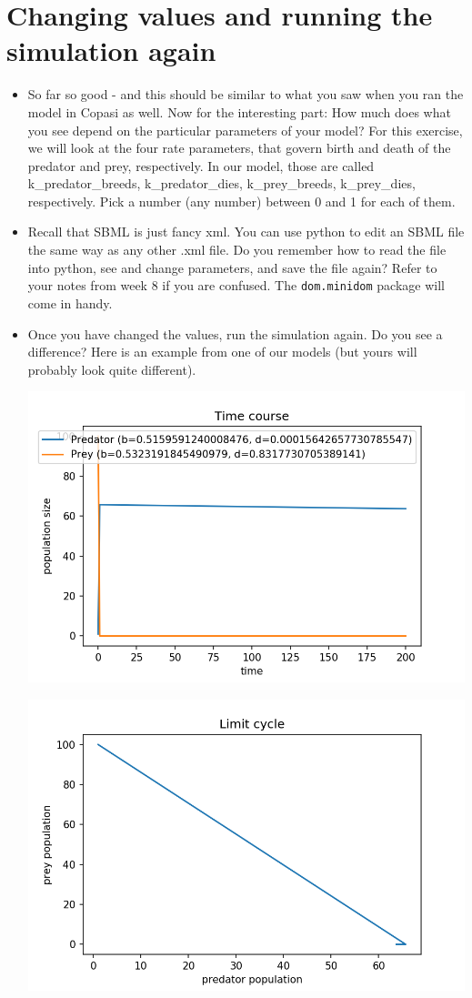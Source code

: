 \documentclass[pdflatex,a4paper]{article}
\begin{document}
\section{Changing values and running the simulation again}

\begin{itemize}
\item
So far so good - and this should be similar to what you saw when you ran the model in Copasi as well. Now for the interesting part: How much does what you see depend on the particular parameters of your model? For this exercise, we will look at the four rate parameters, that govern birth and death of the predator and prey, respectively. In our model, those are called  k\_predator\_breeds, k\_predator\_dies, k\_prey\_breeds, k\_prey\_dies,  respectively. Pick a number (any number) between 0 and 1 for each of them. 
\item
Recall that SBML is just fancy xml. You can use python to edit an SBML file the same way as any other .xml file. Do you remember how to read the file into python, see and change parameters, and save the file again? Refer to your notes from week 8 if you are confused. The \verb=dom.minidom= package will come in handy.
\item
Once you have changed the values, run the simulation again. Do you see a difference? Here is an example from one of our models (but yours will probably look quite different).

\includegraphics{time_course2.png}

\includegraphics{limit_cycle2.png}


\end{itemize}
\end{document}
